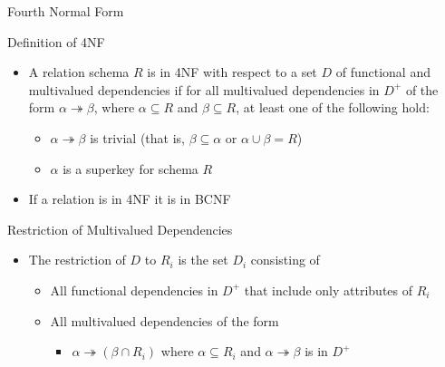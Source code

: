 \documentclass[aspectratio=169, xcolor=dvipsnames]{beamer}
\begin{document}
\begin{frame}{Fourth Normal Form}
    \begin{block}{Definition of 4NF}
        \begin{itemize}[<+->]
            \item A relation schema $R$ is in 4NF with respect to a set $D$ of functional and multivalued dependencies if for all multivalued dependencies in $D^+$ of the form $\alpha \twoheadrightarrow \beta$, where $\alpha \subseteq R$ and $\beta \subseteq R$, at least one of the following hold:
            \begin{itemize}
                \item[$\triangleright$] $\alpha \twoheadrightarrow \beta$ is trivial (that is, $\beta \subseteq \alpha$ or $\alpha \cup \beta = R$)
                \item[$\triangleright$] $\alpha$ is a superkey for schema $R$
            \end{itemize}
            \item If a relation is in 4NF it is in BCNF
        \end{itemize}
    \end{block}
\end{frame}

\begin{frame}{Restriction of Multivalued Dependencies}
    \begin{itemize}[<+->]
        \item The restriction of $D$ to $R_i$ is the set $D_i$ consisting of
        \begin{itemize}
            \item[$\triangleright$] All functional dependencies in $D^+$ that include only attributes of $R_i$
            \item[$\triangleright$] All multivalued dependencies of the form
            \begin{itemize}
                \item $\alpha \twoheadrightarrow (\beta \cap R_i)$ where $\alpha \subseteq R_i$ and $\alpha \twoheadrightarrow \beta$ is in $D^+$
            \end{itemize}
        \end{itemize}
    \end{itemize}
\end{frame}
\end{document}
